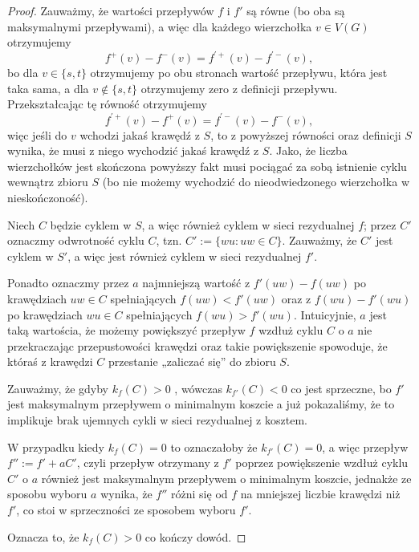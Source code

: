 \begin{theorem}
\begin{proof}
		Zauważmy, że wartości przepływów $f$ i $f'$ są równe (bo oba są
		maksymalnymi przepływami), a więc dla każdego wierzchołka
		$v \in V(G)$ otrzymujemy
		\[f^+(v) - f^-(v) = f^{'+}(v) - f^{'-}(v),\]
		bo dla $v \in \{s, t\}$ otrzymujemy po obu 
		stronach wartość przepływu, która jest taka sama, a
		dla  $v \not \in \{s, t\}$ otrzymujemy zero z definicji przepływu.
		Przekształcając tę równość otrzymujemy
		\[f^{'+}(v) - f^+(v) = f^{'-}(v) - f^{-}(v),\]
		więc jeśli do $v$ wchodzi jakaś krawędź z $S$, to 
		z powyższej równości oraz definicji $S$ wynika, że
		musi z niego wychodzić jakaś krawędź z $S$. Jako, że
		liczba wierzchołków jest skończona powyższy fakt musi 
		pociągać za sobą istnienie cyklu wewnątrz zbioru $S$ (bo
		nie możemy wychodzić
		do nieodwiedzonego wierzchołka w nieskończoność).
		
		Niech $C$ będzie cyklem w $S$, a więc również 
		cyklem w sieci rezydualnej $f$; przez $C'$ oznaczmy
		odwrotność cyklu $C$, tzn. $C' := \{wu : uw \in C\}$.
		Zauważmy, że $C'$ jest cyklem w $S'$, a więc jest
		również cyklem w sieci rezydualnej $f'$. 
		
		Ponadto oznaczmy
		przez $a$ najmniejszą wartość z $f'(uw) - f(uw)$ po krawędziach
		$uw \in C$ spełniających $f(uw) < f'(uw)$ oraz z 
		$f(wu) - f'(wu)$ po krawędziach $wu \in C$ spełniających
		$f(wu) > f'(wu)$. Intuicyjnie, $a$ jest taką wartościa, 
		że
		możemy powiększyć przepływ $f$ wzdłuż cyklu $C$ o $a$ 
		nie przekraczając przepustowości krawędzi oraz 
		takie powiększenie
		spowoduje, że któraś z krawędzi $C$ przestanie 
		„zaliczać się” do zbioru $S$.
		
		Zauważmy, że gdyby $k_f(C) > 0$ , wówczas $k_{f'}(C) < 0$
		co jest sprzeczne, bo $f'$ jest maksymalnym
		przepływem o minimalnym koszcie a już pokazaliśmy,
		że to implikuje brak ujemnych cykli
		w sieci rezydualnej z kosztem.
		
		W przypadku kiedy $k_f(C) = 0$ to oznaczałoby że $k_{f'}(C)=0$,
		a więc przepływ $f'' := f' + aC'$, czyli przepływ otrzymany
		z $f'$ poprzez powiększenie wzdłuż cyklu $C'$ o $a$ również 
		jest maksymalnym przepływem o minimalnym koszcie, jednakże
		ze sposobu wyboru $a$ wynika, że $f''$ różni się od $f$
		na mniejszej liczbie krawędzi niż $f'$, co stoi w 
		sprzeczności ze sposobem wyboru $f'$.
		
		Oznacza to, że $k_f(C) > 0$ co kończy dowód.
		
	\end{proof}
	\label{mincost_maxflow_proof}
\end{theorem}

